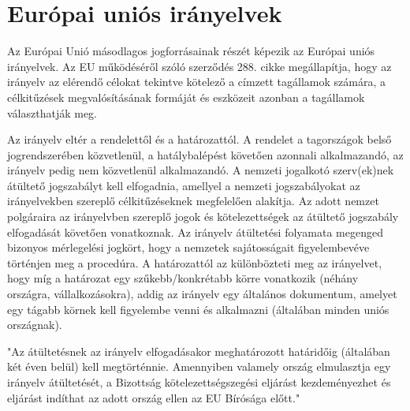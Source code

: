 \section{Európai uniós irányelvek}

Az Európai Unió másodlagos jogforrásainak részét képezik az Európai uniós irányelvek. Az EU működéséről szóló szerződés 288. cikke megállapítja, hogy az irányelv az elérendő célokat tekintve kötelező a címzett tagállamok számára, a célkitűzések megvalósításának formáját és eszközeit azonban a tagállamok választhatják meg. 

Az irányelv eltér a rendelettől és a határozattól. A rendelet a tagországok belső jogrendszerében közvetlenül, a hatálybalépést követően azonnali alkalmazandó, az irányelv pedig nem közvetlenül alkalmazandó. A nemzeti jogalkotó szerv(ek)nek átültető jogszabályt kell elfogadnia, amellyel a nemzeti jogszabályokat az irányelvekben szereplő célkitűzéseknek megfelelően alakítja. Az adott nemzet polgáraira az irányelvben szereplő jogok és kötelezettségek az átültető jogszabály elfogadását követően vonatkoznak. Az irányelv átültetési folyamata megenged bizonyos mérlegelési jogkört, hogy a nemzetek sajátosságait figyelembevéve történjen meg a procedúra. A határozattól az különbözteti meg az irányelvet, hogy míg a határozat egy szűkebb/konkrétabb körre vonatkozik (néhány országra, vállalkozásokra), addig az irányelv egy általános dokumentum, amelyet egy tágabb körnek kell figyelembe venni és alkalmazni (általában minden uniós országnak).

"Az átültetésnek az irányelv elfogadásakor meghatározott határidőig (általában két éven belül) kell megtörténnie. Amennyiben valamely ország elmulasztja egy irányelv átültetését, a Bizottság kötelezettségszegési eljárást kezdeményezhet és eljárást indíthat az adott ország ellen az EU Bírósága előtt." \cite{EU-iranyelvek} \cite{EU-jog}